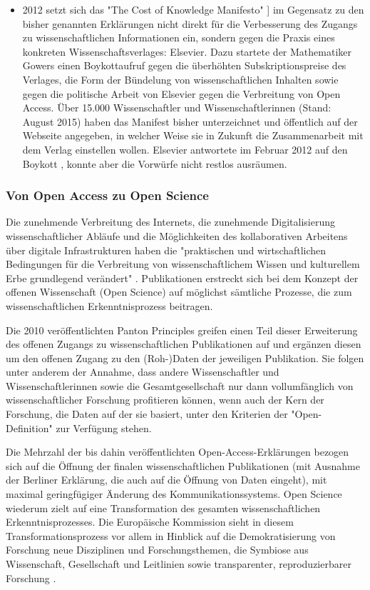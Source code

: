 \begin{itemize}
\item 2012 setzt sich das "The Cost of Knowledge Manifesto" \cite{Gowers_2012} ] im Gegensatz zu den bisher genannten Erklärungen nicht direkt für die Verbesserung des Zugangs zu wissenschaftlichen Informationen ein, sondern gegen die Praxis eines konkreten Wissenschaftsverlages: Elsevier. Dazu startete der Mathematiker Gowers einen Boykottaufruf gegen die überhöhten Subskriptionspreise des Verlages, die Form der Bündelung von wissenschaftlichen Inhalten sowie gegen die politische Arbeit von Elsevier gegen die Verbreitung von Open Access. Über 15.000 Wissenschaftler und Wissenschaftlerinnen (Stand: August 2015) haben das Manifest bisher unterzeichnet und öffentlich auf der Webseite angegeben, in welcher Weise sie in Zukunft die Zusammenarbeit mit dem Verlag einstellen wollen. Elsevier antwortete im Februar 2012 auf den Boykott \cite{elsevier_2012}, konnte aber die Vorwürfe nicht restlos ausräumen.
\end{itemize}

\subsubsection{Von Open Access zu Open Science}

Die zunehmende Verbreitung des Internets, die zunehmende Digitalisierung wissenschaftlicher Abläufe und die Möglichkeiten des kollaborativen Arbeitens über digitale Infrastrukturen haben die "praktischen und wirtschaftlichen Bedingungen für die Verbreitung von wissenschaftlichem Wissen und kulturellem Erbe grundlegend verändert" \cite{berliner_erklaerung_2003}. Publikationen erstreckt sich bei dem Konzept der offenen Wissenschaft (Open Science) auf möglichst sämtliche Prozesse, die zum wissenschaftlichen Erkenntnisprozess beitragen.

Die 2010 veröffentlichten Panton Principles \cite{Mounce_2015} greifen einen Teil dieser Erweiterung des offenen Zugangs zu wissenschaftlichen Publikationen auf und ergänzen diesen um den offenen Zugang zu den (Roh-)Daten der jeweiligen Publikation. Sie folgen unter anderem der Annahme, dass andere Wissenschaftler und Wissenschaftlerinnen sowie die Gesamtgesellschaft nur dann vollumfänglich von wissenschaftlicher Forschung profitieren können, wenn auch der Kern der Forschung, die Daten auf der sie basiert, unter den Kriterien der "Open-Definition" \cite{open_definition} zur Verfügung stehen.

Die Mehrzahl der bis dahin veröffentlichten Open-Access-Erklärungen bezogen sich auf die Öffnung der finalen wissenschaftlichen Publikationen (mit Ausnahme der Berliner Erklärung, die auch auf die Öffnung von Daten eingeht), mit maximal geringfügiger Änderung des Kommunikationssystems. Open Science wiederum zielt auf eine Transformation des gesamten wissenschaftlichen Erkenntnisprozesses. Die Europäische Kommission sieht in diesem Transformationsprozess vor allem in Hinblick auf die Demokratisierung von Forschung neue Disziplinen und Forschungsthemen, die Symbiose aus Wissenschaft, Gesellschaft und Leitlinien sowie transparenter, reproduzierbarer Forschung \cite{eu_agenda_open_science_2015}.

